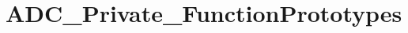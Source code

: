 \hypertarget{group___a_d_c___private___function_prototypes}{}\section{A\+D\+C\+\_\+\+Private\+\_\+\+Function\+Prototypes}
\label{group___a_d_c___private___function_prototypes}
